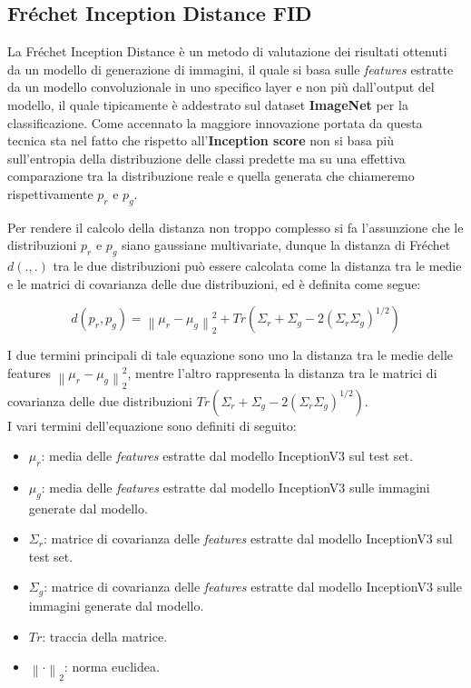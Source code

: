 \subsection{Fréchet Inception Distance FID}
La Fréchet Inception Distance è un metodo di valutazione dei risultati ottenuti da un modello di generazione di immagini, il quale si basa sulle \textit{features} estratte
da un modello convoluzionale in uno specifico layer e non più dall'output del modello, il quale tipicamente è addestrato sul dataset \textbf{ImageNet} per la classificazione.
Come accennato la maggiore innovazione portata da questa tecnica sta nel fatto che rispetto all'\textbf{Inception score} non si basa più sull'entropia della distribuzione delle classi predette ma su una effettiva comparazione tra la distribuzione reale e quella generata che chiameremo rispettivamente $p_r$ e $p_g$.

Per rendere il calcolo della distanza non troppo complesso si fa l'assunzione che le distribuzioni $p_r$ e $p_g$ siano gaussiane multivariate, dunque
la distanza di Fréchet $d(.,.)$ tra le due distribuzioni può essere calcolata come la distanza tra le medie e le matrici di covarianza delle due distribuzioni,
ed è definita come segue:

\begin{equation}
    d(p_r, p_g) = \left \| \mu_r - \mu_g \right \|_2^2 + Tr(\Sigma_r + \Sigma_g - 2(\Sigma_r\Sigma_g)^{1/2})
\end{equation}

I due termini principali di tale equazione sono uno la distanza tra le medie delle features $\left \| \mu_r - \mu_g \right \|_2^2$, mentre l'altro
rappresenta la distanza tra le matrici di covarianza delle due distribuzioni $Tr(\Sigma_r + \Sigma_g - 2(\Sigma_r\Sigma_g)^{1/2})$.\\
I vari termini dell'equazione sono definiti di seguito:

\begin{itemize}
    \item \textbf{$\mu_r$}: media delle \textit{features} estratte dal modello InceptionV3 sul test set.
    \item \textbf{$\mu_g$}: media delle \textit{features} estratte dal modello InceptionV3 sulle immagini generate dal modello.
    \item \textbf{$\Sigma_r$}: matrice di covarianza delle \textit{features} estratte dal modello InceptionV3 sul test set.
    \item \textbf{$\Sigma_g$}: matrice di covarianza delle \textit{features} estratte dal modello InceptionV3 sulle immagini generate dal modello.
    \item \textbf{$Tr$}: traccia della matrice.
    \item \textbf{$\left \| \cdot \right \|_2$}: norma euclidea.
\end{itemize}

